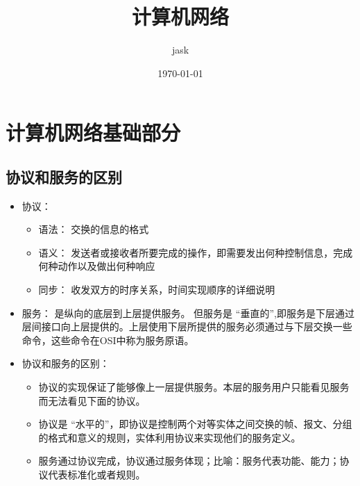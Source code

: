 \documentclass[11pt]{article}
\author{jask}
\date{\today}
\title{计算机网络}
\begin{document}
\maketitle
\setcounter{tocdepth}{3}
\tableofcontents



\section{计算机网络基础部分}
\label{sec:org75f8c79}
\subsection{协议和服务的区别}
\label{sec:org01fcbc3}
\begin{itemize}
\item 协议：
\begin{itemize}
\item 语法： 交换的信息的格式
\item 语义： 发送者或接收者所要完成的操作，即需要发出何种控制信息，完成何种动作以及做出何种响应
\item 同步： 收发双方的时序关系，时间实现顺序的详细说明
\end{itemize}
\item 服务： 是纵向的底层到上层提供服务。
但服务是 “垂直的”,即服务是下层通过层间接口向上层提供的。上层使用下层所提供的服务必须通过与下层交换一些命令，这些命令在OSI中称为服务原语。
\item 协议和服务的区别：
\begin{itemize}
\item 协议的实现保证了能够像上一层提供服务。本层的服务用户只能看见服务而无法看见下面的协议。
\item 协议是 “水平的”，即协议是控制两个对等实体之间交换的帧、报文、分组的格式和意义的规则，实体利用协议来实现他们的服务定义。
\item 服务通过协议完成，协议通过服务体现；比喻：服务代表功能、能力；协议代表标准化或者规则。
\end{itemize}
\end{itemize}
\end{document}
